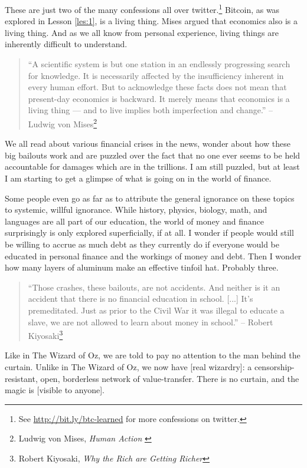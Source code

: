These are just two of the many confessions all over twitter.\footnote{See
\url{http://bit.ly/btc-learned} for more confessions on twitter.} Bitcoin, as
was explored in Lesson \ref{les:1}, is a living thing. Mises argued that
economics also is a living thing. And as we all know from personal experience,
living things are inherently difficult to understand.

\begin{quotation}
``A scientific system is but one station in an endlessly progressing
search for knowledge. It is necessarily affected by the insufficiency
inherent in every human effort. But to acknowledge these facts does
not mean that present-day economics is backward. It merely means that
economics is a living thing --- and to live implies both imperfection
and change.''
\flushright -- Ludwig von Mises\footnote{Ludwig von Mises, \textit{Human Action}
\cite{human-action}}
\end{quotation}

We all read about various financial crises in the news, wonder about how
these big bailouts work and are puzzled over the fact that no one ever
seems to be held accountable for damages which are in the trillions. I
am still puzzled, but at least I am starting to get a glimpse of what is
going on in the world of finance.

Some people even go as far as to attribute the general ignorance on
these topics to systemic, willful ignorance. While history, physics,
biology, math, and languages are all part of our education, the world of
money and finance surprisingly is only explored superficially, if at
all. I wonder if people would still be willing to accrue as much debt as
they currently do if everyone would be educated in personal finance and
the workings of money and debt. Then I wonder how many layers of
aluminum make an effective tinfoil hat. Probably three.

\begin{quotation}
``Those crashes, these bailouts, are not accidents. And neither is it an
accident that there is no financial education in school. [...] It's
premeditated. Just as prior to the Civil War it was illegal to educate a slave,
we are not allowed to learn about money in school.''
\flushright -- Robert Kiyosaki\footnote{Robert Kiyosaki, \textit{Why the Rich
are Getting Richer}\cite{robert-kiyosaki}}
\end{quotation}

Like in The Wizard of Oz, we are told to pay no attention to the man
behind the curtain. Unlike in The Wizard of Oz, we now have [real
wizardry]: a censorship-resistant, open, borderless network of
value-transfer. There is no curtain, and the magic is [visible to
anyone].

